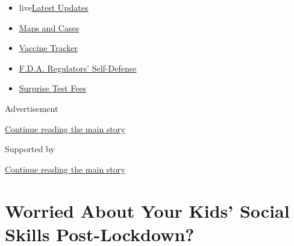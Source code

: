 \begin{itemize}
\tightlist
\item
  live\href{https://www.nytimes3xbfgragh.onion/2020/09/11/world/covid-19-coronavirus.html?name=styln-coronavirus-national\&region=TOP_BANNER\&block=storyline_menu_recirc\&action=click\&pgtype=Article\&impression_id=a3ff7031-f4c6-11ea-a7aa-59ff5ebfc7d3\&variant=undefined}{Latest
  Updates}
\item
  \href{https://www.nytimes3xbfgragh.onion/interactive/2020/us/coronavirus-us-cases.html?name=styln-coronavirus-national\&region=TOP_BANNER\&block=storyline_menu_recirc\&action=click\&pgtype=Article\&impression_id=a3ff9740-f4c6-11ea-a7aa-59ff5ebfc7d3\&variant=undefined}{Maps
  and Cases}
\item
  \href{https://www.nytimes3xbfgragh.onion/interactive/2020/science/coronavirus-vaccine-tracker.html?name=styln-coronavirus-national\&region=TOP_BANNER\&block=storyline_menu_recirc\&action=click\&pgtype=Article\&impression_id=a3ff9741-f4c6-11ea-a7aa-59ff5ebfc7d3\&variant=undefined}{Vaccine
  Tracker}
\item
  \href{https://www.nytimes3xbfgragh.onion/2020/09/10/us/politics/fda-coronavirus-vaccine.html?name=styln-coronavirus-national\&region=TOP_BANNER\&block=storyline_menu_recirc\&action=click\&pgtype=Article\&impression_id=a3ff9742-f4c6-11ea-a7aa-59ff5ebfc7d3\&variant=undefined}{F.D.A.
  Regulators' Self-Defense}
\item
  \href{https://www.nytimes3xbfgragh.onion/2020/09/09/upshot/coronavirus-surprise-test-fees.html?name=styln-coronavirus-national\&region=TOP_BANNER\&block=storyline_menu_recirc\&action=click\&pgtype=Article\&impression_id=a3ff9743-f4c6-11ea-a7aa-59ff5ebfc7d3\&variant=undefined}{Surprise
  Test Fees}
\end{itemize}

Advertisement

\protect\hyperlink{after-top}{Continue reading the main story}

Supported by

\protect\hyperlink{after-sponsor}{Continue reading the main story}

\hypertarget{worried-about-your-kids-social-skills-post-lockdown}{%
\section{Worried About Your Kids' Social Skills
Post-Lockdown?}\label{worried-about-your-kids-social-skills-post-lockdown}}

